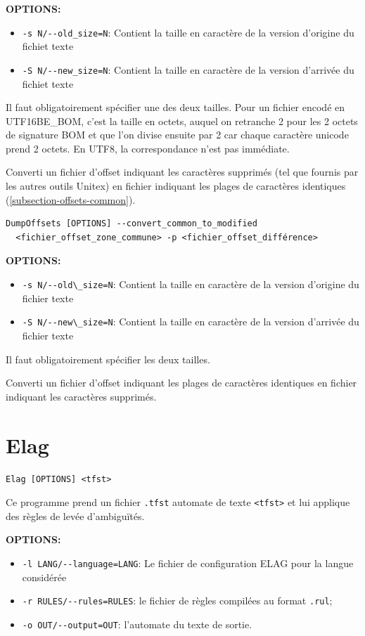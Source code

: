 \noindent \textbf{OPTIONS:}
\begin{itemize}
\item \verb+-s N/--old_size=N+: Contient la taille en caractère de la version d'origine du fichiet texte
\item \verb+-S N/--new_size=N+: Contient la taille en caractère de la version d'arrivée du fichiet texte
\end{itemize}
Il faut obligatoirement spécifier une des deux tailles. Pour un fichier encodé en UTF16BE\_BOM, c’est la taille en
octets, auquel on retranche 2 pour les 2 octets de signature BOM et que l’on divise ensuite par 2 car chaque
caractère unicode prend 2 octets. En UTF8, la correspondance n’est pas immédiate.

Converti un fichier d'offset indiquant les caractères supprimés (tel que fournis par les autres outils Unitex) en fichier
indiquant les plages de caractères identiques (\ref{subsection-offsets-common}).

\bigskip
\begin{verbatim}
DumpOffsets [OPTIONS] --convert_common_to_modified
  <fichier_offset_zone_commune> -p <fichier_offset_différence>
\end{verbatim}
\bigskip

\noindent \textbf{OPTIONS:}
\begin{itemize}
\item \verb+-s N/--old\_size=N+: Contient la taille en caractère de la version d'origine du fichier texte
\item \verb+-S N/--new\_size=N+: Contient la taille en caractère de la version d'arrivée du fichier texte
\end{itemize}
Il faut obligatoirement spécifier les deux tailles.

Converti un fichier d'offset indiquant les plages de caractères identiques en fichier indiquant les caractères supprimés.



\section{Elag}
\verb+Elag [OPTIONS] <tfst>+

\bigskip
\noindent Ce programme prend un fichier \verb+.tfst+ automate de texte \verb+<tfst>+ et lui applique
des règles de levée d’ambiguïtés. 

\bigskip
\noindent \textbf{OPTIONS:}
\begin{itemize}
\item \verb+-l LANG/--language=LANG+: Le fichier de configuration ELAG pour la langue considérée
  \item \verb+-r RULES/--rules=RULES+: le fichier de règles compilées au format \verb+.rul+;
  \item \verb+-o OUT/--output=OUT+: l’automate du texte de sortie.
\end{itemize}







